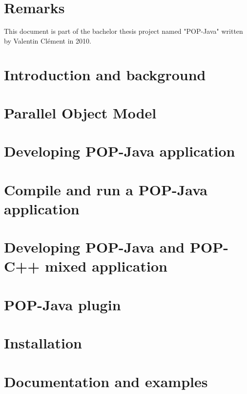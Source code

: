 \documentclass[a4paper, 11pt]{article}
\newcommand{\emptypage}{\newpage \thispagestyle{empty} \mbox{}\newpage}
\begin{document}


\tableofcontents
\pagebreak

\section{Remarks}
This document is part of the bachelor thesis project named "POP-Java" written by Valentin Clément in 2010.

\pagebreak
\section{Introduction and background}


\pagebreak
\section{Parallel Object Model}


\pagebreak
\section{Developing POP-Java application}


\pagebreak
\section{Compile and run a POP-Java application}


\pagebreak
\section{Developing POP-Java and POP-C++ mixed application}


\pagebreak
\section{POP-Java plugin}


\pagebreak
\section{Installation}


\pagebreak
\section{Documentation and examples}

\end{document}
